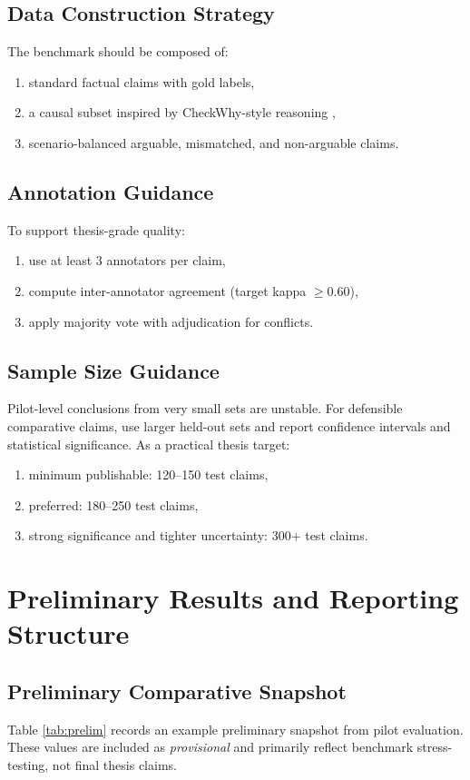 \documentclass[12pt,a4paper,oneside]{report}
\begin{document}
\section{Data Construction Strategy}
The benchmark should be composed of:
\begin{enumerate}
  \item standard factual claims with gold labels,
  \item a causal subset inspired by CheckWhy-style reasoning \citep{si2024checkwhy},
  \item scenario-balanced arguable, mismatched, and non-arguable claims.
\end{enumerate}

\section{Annotation Guidance}
To support thesis-grade quality:
\begin{enumerate}
  \item use at least 3 annotators per claim,
  \item compute inter-annotator agreement (target kappa $\geq 0.60$),
  \item apply majority vote with adjudication for conflicts.
\end{enumerate}

\section{Sample Size Guidance}
Pilot-level conclusions from very small sets are unstable.
For defensible comparative claims, use larger held-out sets and report confidence intervals and statistical significance.
As a practical thesis target:
\begin{enumerate}
  \item minimum publishable: 120--150 test claims,
  \item preferred: 180--250 test claims,
  \item strong significance and tighter uncertainty: 300+ test claims.
\end{enumerate}

\chapter{Preliminary Results and Reporting Structure}
\label{chap:results}

\section{Preliminary Comparative Snapshot}
Table \ref{tab:prelim} records an example preliminary snapshot from pilot evaluation.
These values are included as \textit{provisional} and primarily reflect benchmark stress-testing, not final thesis claims.
\end{document}
